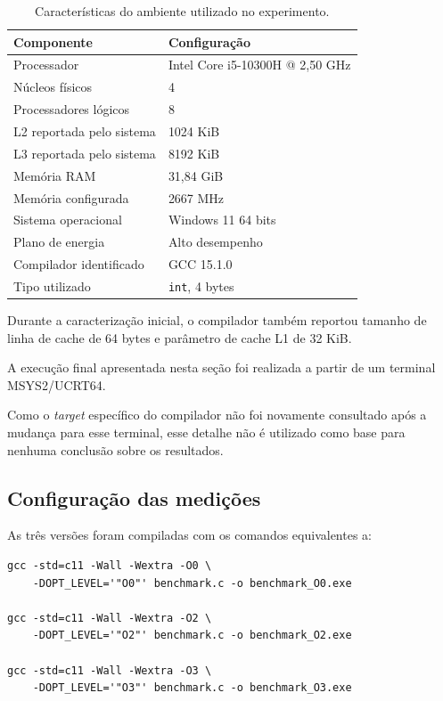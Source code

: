\begin{table}[htbp]
    \centering
    \caption{Características do ambiente utilizado no experimento.}
    \label{tab:atvd02-ambiente}
    \begin{tabular}{l|l}
        \hline
        Componente & Configuração \\
        \hline
        Processador & Intel Core i5-10300H @ 2,50 GHz \\
        Núcleos físicos & 4 \\
        Processadores lógicos & 8 \\
        L2 reportada pelo sistema & 1024 KiB \\
        L3 reportada pelo sistema & 8192 KiB \\
        Memória RAM & 31,84 GiB \\
        Memória configurada & 2667 MHz \\
        Sistema operacional & Windows 11 64 bits \\
        Plano de energia & Alto desempenho \\
        Compilador identificado & GCC 15.1.0 \\
        Tipo utilizado & \texttt{int}, 4 bytes \\
        \hline
    \end{tabular}
\end{table}

Durante a caracterização inicial, o compilador também reportou tamanho de linha de cache de
64 bytes e parâmetro de cache L1 de 32 KiB.

A execução final apresentada nesta seção foi realizada a partir de um terminal MSYS2/UCRT64.

Como o \textit{target} específico do compilador não foi novamente consultado após a mudança
para esse terminal, esse detalhe não é utilizado como base para nenhuma conclusão sobre os
resultados.


\subsection{Configuração das medições}

As três versões foram compiladas com os comandos equivalentes a:

\begin{verbatim}
gcc -std=c11 -Wall -Wextra -O0 \
    -DOPT_LEVEL='"O0"' benchmark.c -o benchmark_O0.exe

gcc -std=c11 -Wall -Wextra -O2 \
    -DOPT_LEVEL='"O2"' benchmark.c -o benchmark_O2.exe

gcc -std=c11 -Wall -Wextra -O3 \
    -DOPT_LEVEL='"O3"' benchmark.c -o benchmark_O3.exe
\end{verbatim}

